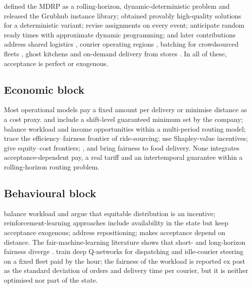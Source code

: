 \documentclass[a4paper,11pt,review,3p,authoryear]{elsarticle}
\begin{document}
\cite{reyes2018meal} defined the MDRP as a rolling-horizon, dynamic-deterministic problem and released the Grubhub instance library; \cite{yildiz2019provably} obtained provably high-quality solutions for a deterministic variant; \cite{steever2019dynamic} revise assignments on every event; \cite{Ulmer2021} anticipate random ready times with approximate dynamic programming; and later contributions address shared logistics \citep{bi2023meal}, courier operating regions \citep{auad2023courier}, batching for crowdsourced fleets \citep{simoni2023crowdsourced}, ghost kitchens \citep{neria2024restaurant} and on-demand delivery from stores \citep{liu2021multiperiod}. In all of these, acceptance is perfect or exogenous.

\subsection{Economic block}
\label{sec:App_lit_economic}

Most operational models pay a fixed amount per delivery or minimise distance as a cost proxy. \cite{reyes2018meal} and \cite{yildiz2019provably} include a shift-level guaranteed minimum set by the company; \cite{wen2010dynamic} balance workload and income opportunities within a multi-period routing model; \cite{lesmana2019balancing} trace the efficiency--fairness frontier of ride-sourcing; \cite{bajec2022strategic} use Shapley-value incentives; \cite{sobhanan2026equity} give equity--cost frontiers; \cite{gupta2022fairfoody}, \cite{nair2022work4food} and \cite{martinez2024exploring} bring fairness to food delivery. None integrates acceptance-dependent pay, a real tariff and an intertemporal guarantee within a rolling-horizon routing problem.

\subsection{Behavioural block}
\label{sec:App_lit_behavioural}

\cite{liao2020multi} balance workload and argue that equitable distribution is an incentive; reinforcement-learning approaches \citep{ahamed2020deep,bozanta2022courier} include availability in the state but keep acceptance exogenous; \cite{haferkamp2023heatmap} address repositioning; \cite{quintero2020computational} makes acceptance depend on distance. The fair-machine-learning literature shows that short- and long-horizon fairness diverge \citep{corbettdavies2023measure}. \citet{cheng2025realtime} train deep Q-networks for dispatching and idle-courier steering on a fixed fleet paid by the hour; the fairness of the workload is reported ex post as the standard deviation of orders and delivery time per courier, but it is neither optimised nor part of the state.
\end{document}
